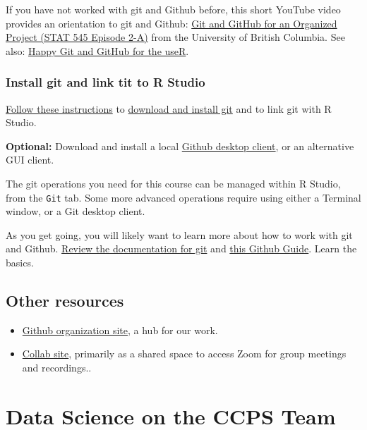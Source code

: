 \documentclass[
]{book}
\providecommand{\tightlist}{%
  \setlength{\itemsep}{0pt}\setlength{\parskip}{0pt}}
\begin{document}
If you have not worked with git and Github before, this short YouTube video provides an orientation to git and Github: \href{https://www.youtube.com/watch?v=l2ftm-YwJs8}{Git and GitHub for an Organized Project (STAT 545 Episode 2-A)} from the University of British Columbia. See also: \href{https://happygitwithr.com/}{Happy Git and GitHub for the useR}.

\hypertarget{install-git-and-link-tit-to-r-studio}{%
\subsection{Install git and link tit to R Studio}\label{install-git-and-link-tit-to-r-studio}}

\href{https://jennybc.github.io/2014-05-12-ubc/ubc-r/session03_git.html}{Follow these instructions} to \href{https://git-scm.com/downloads}{download and install git} and to link git with R Studio.

\textbf{Optional:} Download and install a local \href{https://git-scm.com/downloads/guis}{Github desktop client}, or an alternative GUI client.

The git operations you need for this course can be managed within R Studio, from the \texttt{Git} tab. Some more advanced operations require using either a Terminal window, or a Git desktop client.

As you get going, you will likely want to learn more about how to work with git and Github. \href{https://git-scm.com/}{Review the documentation for git} and \href{https://guides.github.com/introduction/flow/}{this Github Guide}. Learn the basics.

\hypertarget{other-resources}{%
\section{Other resources}\label{other-resources}}

\begin{itemize}
\tightlist
\item
  \href{https://github.com/coopercenter}{Github organization site}, a hub for our work.
\item
  \href{https://collab.its.virginia.edu}{Collab site}, primarily as a shared space to access Zoom for group meetings and recordings..
\end{itemize}

\hypertarget{team}{%
\chapter{Data Science on the CCPS Team}\label{team}}
\end{document}
